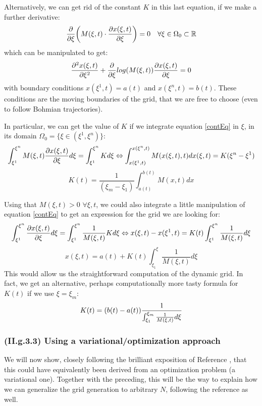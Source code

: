 \documentclass[11pt, a4paper]{article} %
\newcommand{\R}{\mathbb{R}} %
\begin{document}
Alternatively, we can get rid of the constant $K$ in this last equation, if we make a further derivative:
\begin{equation}\label{EL1D}
\pdv{}{\xi}\qty(M(\xi,t)\cdot \pdv{x(\xi,t)}{\xi})=0 \quad \forall \xi\in \Omega_0\subset \R
\end{equation}
which can be manipulated to get:
\begin{equation}
\pdv[2]{x(\xi,t)}{\xi}+\pdv{}{\xi}log(M(\xi,t))\pdv{x(\xi,t)}{\xi}=0
\end{equation}
with boundary conditions $x(\xi^1,t)=a(t)$ and $x(\xi^n,t)=b(t)$. These conditions are the moving boundaries of the grid, that we are free to choose (even to follow Bohmian trajectories).

In particular, we can get the value of $K$ if we integrate equation \eqref{contEq} in $\xi$, in its domain $\Omega_0=\{\xi\in(\xi^1,\xi^n)\}$:
\begin{equation}
\int^{\xi^n}_{\xi^1} M(\xi,t) \pdv{x(\xi,t)}{\xi} d\xi=\int^{\xi^n}_{\xi^1} K d \xi  \Leftrightarrow \int^{x(\xi^n,t)}_{x(\xi^1,t)} M(x(\xi,t),t) dx(\xi,t)=K(\xi^n-\xi^1)
\end{equation}
\begin{equation}
K(t)=\frac{1}{(\xi_m-\xi_1)}\int^{b(t)}_{a(t)} M(x,t) dx
\end{equation}

Using that $M(\xi,t)>0$ $\forall \xi,t$, we could also integrate a little manipulation of equation \eqref{contEq} to get an expression for the grid we are looking for:
\begin{equation}
\int^{\xi^n}_{\xi^1}  \pdv{x(\xi,t)}{\xi} d\xi=\int^{\xi^n}_{\xi^1} \frac{1}{M(\xi,t)} K d \xi  \Leftrightarrow x(\xi,t)-x(\xi^1,t) =K(t)\int^{\xi^n}_{\xi^1} \frac{1}{M(\xi,t)}  d \xi
\end{equation}
\begin{equation}
x(\xi,t)=a(t)+K(t)\int^\xi_{\xi_1} \frac{1}{M(\xi,t)}d\xi
\end{equation}
This would allow us the straightforward computation of the dynamic grid. In fact, we get an alternative, perhaps computationally more tasty formula for $K(t)$ if we use $\xi=\xi_m$:
\begin{equation}
K(t)=(b(t)-a(t))\frac{1}{\int^{\xi_m}_{\xi_1} \frac{1}{M(\xi,t)}d\xi}\vspace{-0.2cm}
\end{equation}

\subsubsection*{\bf (II.g.3.3) Using a variational/optimization approach}
We will now show, closely following the brilliant exposition of Reference \cite{movingGrids}, that this could have equivalently been derived from an optimization problem (a variational one). Together with the preceding, this will be the way to explain how we can generalize the grid generation to arbitrary $N$, following the reference as well.
\end{document}
